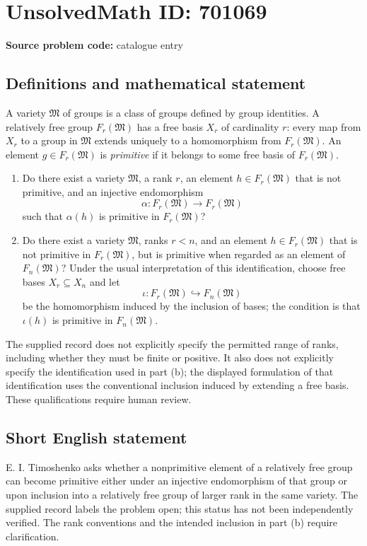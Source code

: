 \documentclass[11pt]{article}
\begin{document}
\section*{UnsolvedMath ID: 701069}
\textbf{Source problem code:} catalogue entry
\subsection{Definitions and mathematical statement}
A variety \(\mathfrak M\) of groups is a class of groups defined by group identities. A relatively free group \(F_r(\mathfrak M)\) has a free basis \(X_r\) of cardinality \(r\): every map from \(X_r\) to a group in \(\mathfrak M\) extends uniquely to a homomorphism from \(F_r(\mathfrak M)\). An element \(g\in F_r(\mathfrak M)\) is \emph{primitive} if it belongs to some free basis of \(F_r(\mathfrak M)\).

\begin{enumerate}
\item[(a)] Do there exist a variety \(\mathfrak M\), a rank \(r\), an element \(h\in F_r(\mathfrak M)\) that is not primitive, and an injective endomorphism
\[
\alpha:F_r(\mathfrak M)\longrightarrow F_r(\mathfrak M)
\]
such that \(\alpha(h)\) is primitive in \(F_r(\mathfrak M)\)?
\item[(b)] Do there exist a variety \(\mathfrak M\), ranks \(r<n\), and an element \(h\in F_r(\mathfrak M)\) that is not primitive in \(F_r(\mathfrak M)\), but is primitive when regarded as an element of \(F_n(\mathfrak M)\)? Under the usual interpretation of this identification, choose free bases \(X_r\subseteq X_n\) and let
\[
\iota:F_r(\mathfrak M)\hookrightarrow F_n(\mathfrak M)
\]
be the homomorphism induced by the inclusion of bases; the condition is that \(\iota(h)\) is primitive in \(F_n(\mathfrak M)\).
\end{enumerate}

The supplied record does not explicitly specify the permitted range of ranks, including whether they must be finite or positive. It also does not explicitly specify the identification used in part (b); the displayed formulation of that identification uses the conventional inclusion induced by extending a free basis. These qualifications require human review.
\subsection{Short English statement}
E. I. Timoshenko asks whether a nonprimitive element of a relatively free group can become primitive either under an injective endomorphism of that group or upon inclusion into a relatively free group of larger rank in the same variety. The supplied record labels the problem open; this status has not been independently verified. The rank conventions and the intended inclusion in part (b) require clarification.
\end{document}
